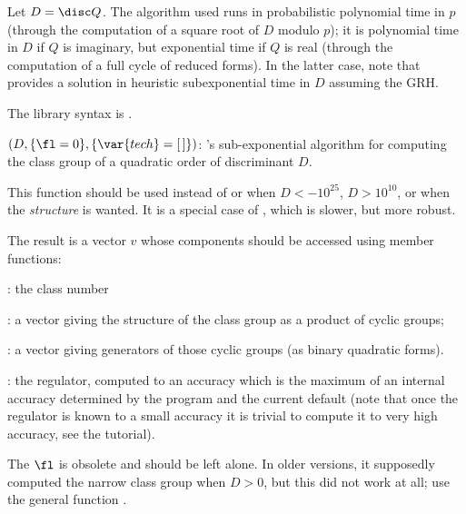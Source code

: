 Let $D = \disc Q$. The algorithm used runs in probabilistic polynomial time
in $p$ (through the computation of a square root of $D$ modulo $p$); it is
polynomial time in $D$ if $Q$ is imaginary, but exponential time if $Q$ is
real (through the computation of a full cycle of reduced forms). In the
latter case, note that  provides a solution in heuristic
subexponential time in $D$ assuming the GRH.

The library syntax is .

$(D,\{\fl=0\},\{\var{tech}=[\,]\})$: \label{se:quadclassunit}'s sub-exponential algorithm for computing the
class group of a quadratic order of discriminant $D$.

This function should be used instead of  or 
when $D<-10^{25}$, $D>10^{10}$, or when the \emph{structure} is wanted. It
is a special case of , which is slower, but more robust.

The result is a vector $v$ whose components should be accessed using member
functions:

\item {}: the class number

\item {}: a vector giving the structure of the class group as a
product of cyclic groups;

\item {}: a vector giving generators of those cyclic groups (as
binary quadratic forms).

\item {}: the regulator, computed to an accuracy which is the
maximum of an internal accuracy determined by the program and the current
default (note that once the regulator is known to a small accuracy it is
trivial to compute it to very high accuracy, see the tutorial).

The $\fl$ is obsolete and should be left alone. In older versions,
it supposedly computed the narrow class group when $D>0$, but this did not
work at all; use the general function .

